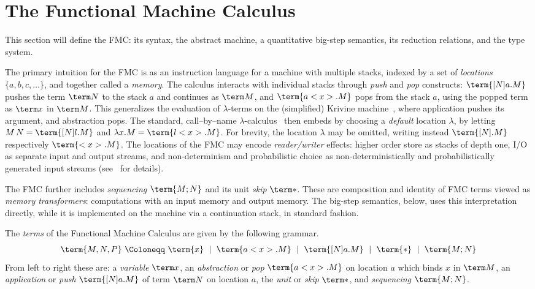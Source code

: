 \documentclass[a4paper,UKenglish,cleveref, autoref, thm-restate]{lipics-v2021}
\begin{document}
\section{The Functional Machine Calculus}
\label{sec:FMC}

This section will define the FMC: its syntax, the abstract machine, a quantitative big-step semantics, its reduction relations, and the type system. 

The primary intuition for the FMC is as an instruction language for a machine with multiple stacks, indexed by a set of \emph{locations} $\{a,b,c,\dots\}$, and together called a \emph{memory}. The calculus interacts with individual stacks through \emph{push} and \emph{pop} constructs: $\term{[N]a.M}$ pushes the term $\term N$ to the stack $a$ and continues as $\term M$, and $\term{a<x>.M}$ pops from the stack $a$, using the popped term as $\term x$ in $\term M$. This generalizes the evaluation of $\lambda$-terms on the (simplified) Krivine machine~\cite{Krivine-2007}, where application pushes its argument, and abstraction pops. The standard, call--by--name $\lambda$-calculus~\cite{Plotkin-1975} then embeds by choosing a \emph{default} location $\lambda$, by letting $M\,N=\term{[N]l.M}$ and $\lambda x.M=\term{l<x>.M}$. For brevity, the location $\lambda$ may be omitted, writing instead $\term{[N].M}$ respectively $\term{<x>.M}$. The locations of the FMC may encode \emph{reader/writer} effects: higher order store as stacks of depth one, I/O as separate input and output streams, and non-determinism and probabilistic choice as non-deterministically and probabilistically generated input streams (see~\cite{Heijltjes-2022} for details).

The FMC further includes \emph{sequencing} $\term{M;N}$ and its unit \emph{skip} $\term*$. These are composition and identity of FMC terms viewed as \emph{memory transformers}: computations with an input memory and output memory. The big-step semantics, below, uses this interpretation directly, while it is implemented on the machine  via a continuation stack, in standard fashion. 

\begin{definition}[Syntax]
The \emph{terms} of the Functional Machine Calculus are given by the following grammar.
\[
	\term{M,N,P}~\Coloneqq~
		\term{x}
~\mid~	\term{a<x>.M}
~\mid~	\term{[N]a.M}
~\mid~	\term{*}
~\mid~	\term{M;N}	
\]
From left to right these are: a \emph{variable} $\term x$, an \emph{abstraction} or \emph{pop} $\term{a<x>.M}$ on location $a$ which binds $x$ in $\term M$, an \emph{application} or \emph{push} $\term{[N]a.M}$ of term $\term N$ on location $a$, the \emph{unit} or \emph{skip} $\term*$, and \emph{sequencing} $\term{M;N}$.
\end{definition}
\end{document}

